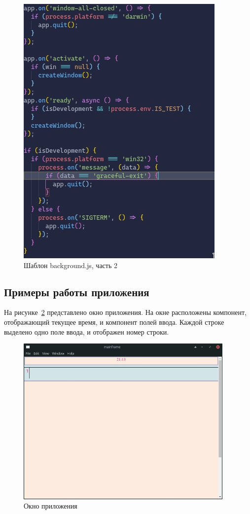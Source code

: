 \begin{figure}[H]
  \centering
  \includegraphics[height=0.4\textheight]{TexModules/pics/backPT2.jpg}
  \caption{Шаблон background.js, часть 2}
  \label{img:backPT2}
\end{figure}

\subsection{Примеры работы приложения}

На рисунке~\ref{img:oknoPrilojeniya} представлено окно приложения. На окне расположены компонент, отображающий текущее время, и компонент полей ввода. Каждой строке выделено одно поле ввода, и отображен номер строки.

\begin{figure}[H]
  \centering
  \includegraphics[width=0.95\textwidth]{TexModules/pics/oknoPrilojeniya.jpg}
  \caption{Окно приложения}
  \label{img:oknoPrilojeniya}
\end{figure}

